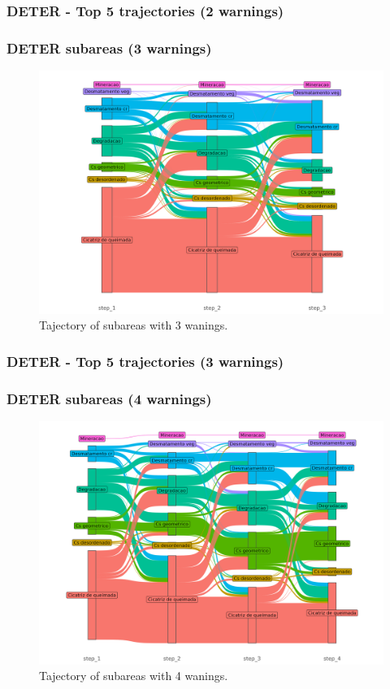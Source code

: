 \documentclass[aspectratio=169]{beamer}
\begin{document}
\begin{frame}[allowframebreaks]
    \frametitle{DETER - Top 5 trajectories (2 warnings)}
    
\end{frame}

\begin{frame}
    \frametitle{DETER subareas (3 warnings)}
    \begin{figure}[h] 
        \includegraphics[width=0.65\linewidth]
        {./figures/plot_deter_subarea_trajectory_3.png}
        \caption{Tajectory of subareas with 3 wanings.}
        \label{fig:deter_subarea_trajectory_3}
    \end{figure}
\end{frame}

\begin{frame}[allowframebreaks]
    \frametitle{DETER - Top 5 trajectories (3 warnings)}
    
\end{frame}

\begin{frame}
    \frametitle{DETER subareas (4 warnings)}
    \begin{figure}[h] 
        \includegraphics[width=0.65\linewidth]
        {./figures/plot_deter_subarea_trajectory_4.png}
        \caption{Tajectory of subareas with 4 wanings.}
        \label{fig:deter_subarea_trajectory_4}
    \end{figure}
\end{frame}
\end{document}
